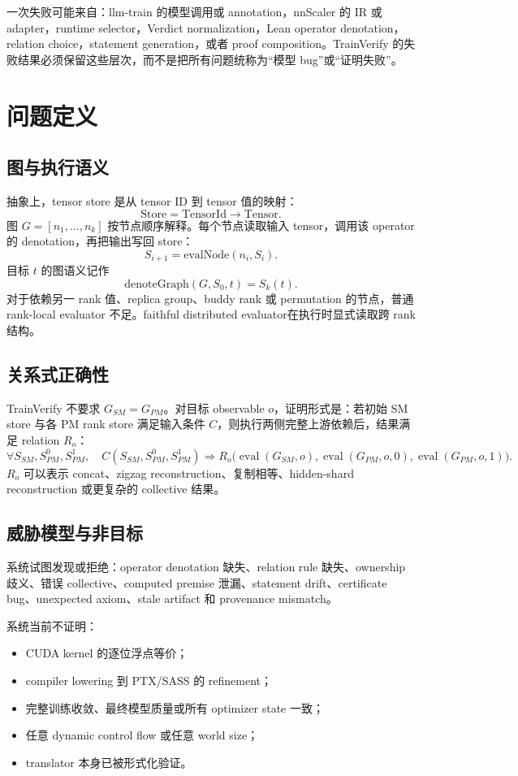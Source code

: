 \documentclass[10.5pt,a4paper]{ctexart}
\begin{document}
一次失败可能来自：llm-train 的模型调用或 annotation，nnScaler 的 IR 或 adapter，runtime selector，Verdict normalization，Lean operator denotation，relation choice，statement generation，或者 proof composition。TrainVerify 的失败结果必须保留这些层次，而不是把所有问题统称为“模型 bug”或“证明失败”。

\section{问题定义}

\subsection{图与执行语义}

抽象上，tensor store 是从 tensor ID 到 tensor 值的映射：
\[
\mathrm{Store}=\mathrm{TensorId}\to\mathrm{Tensor}.
\]
图 $G=[n_1,\ldots,n_k]$ 按节点顺序解释。每个节点读取输入 tensor，调用该 operator 的 denotation，再把输出写回 store：
\[
S_{i+1}=\mathrm{evalNode}(n_i,S_i).
\]
目标 $t$ 的图语义记作
\[
\mathrm{denoteGraph}(G,S_0,t)=S_k(t).
\]
对于依赖另一 rank 值、replica group、buddy rank 或 permutation 的节点，普通 rank-local evaluator 不足。faithful distributed evaluator在执行时显式读取跨 rank 结构。

\subsection{关系式正确性}

TrainVerify 不要求 $G_{SM}=G_{PM}$。对目标 observable $o$，证明形式是：若初始 SM store 与各 PM rank store 满足输入条件 $C$，则执行两侧完整上游依赖后，结果满足 relation $R_o$：
\[
\forall S_{SM},S_{PM}^{0},S_{PM}^{1},\quad
C(S_{SM},S_{PM}^{0},S_{PM}^{1})
\Rightarrow
R_o\bigl(\operatorname{eval}(G_{SM},o),
          \operatorname{eval}(G_{PM},o,0),
          \operatorname{eval}(G_{PM},o,1)\bigr).
\]
$R_o$ 可以表示 concat、zigzag reconstruction、复制相等、hidden-shard reconstruction 或更复杂的 collective 结果。

\subsection{威胁模型与非目标}

系统试图发现或拒绝：operator denotation 缺失、relation rule 缺失、ownership 歧义、错误 collective、computed premise 泄漏、statement drift、certificate bug、unexpected axiom、stale artifact 和 provenance mismatch。

系统当前不证明：
\begin{itemize}
  \item CUDA kernel 的逐位浮点等价；
  \item compiler lowering 到 PTX/SASS 的 refinement；
  \item 完整训练收敛、最终模型质量或所有 optimizer state 一致；
  \item 任意 dynamic control flow 或任意 world size；
  \item translator 本身已被形式化验证。
\end{itemize}
\end{document}

